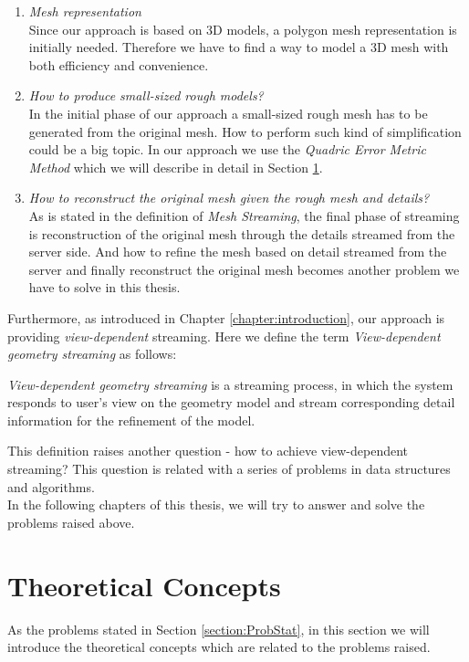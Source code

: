 \begin{enumerate}[label=\roman*]
	\item \emph{Mesh representation}\\
	Since our approach is based on 3D models, a polygon mesh representation is initially needed. Therefore we have to find a way to model a 3D mesh with both efficiency and convenience. 
	\item \emph{How to produce small-sized rough models? }\\
	In the initial phase of our approach a small-sized rough mesh has to be generated from the original mesh. How to perform such kind of simplification could be a big topic. In our approach we use the \emph{Quadric Error Metric Method} which we will describe in detail in Section \ref{section:TheoConcpt}. 
	\item \emph{How to reconstruct the original mesh given the rough mesh and details? }\\
	As is stated in the definition of \emph{Mesh Streaming}, the final phase of streaming is reconstruction of the original mesh through the details streamed from the server side. And how to refine the mesh based on detail streamed from the server and finally reconstruct the original mesh becomes another problem we have to solve in this thesis. 
\end{enumerate}

Furthermore, as introduced in Chapter \ref{chapter:introduction}, our approach is providing \emph{view-dependent} streaming. Here we define the term \emph{View-dependent geometry streaming} as follows: 
\begin{defn}
	\emph{View-dependent geometry streaming} is a streaming process, in which the system responds to user's view on the geometry model and stream corresponding detail information for the refinement of the model. 
\end{defn}
This definition raises another question - how to achieve view-dependent streaming? This question is related with a series of problems in data structures and algorithms. \\

In the following chapters of this thesis, we will try to answer and solve the problems raised above. 

\section{Theoretical Concepts}
\label{section:TheoConcpt}
As the problems stated in Section \ref{section:ProbStat}, in this section we will introduce the theoretical concepts which are related to the problems raised. 

